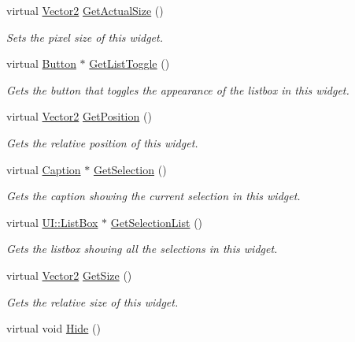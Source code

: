 \begin{DoxyCompactItemize}
virtual \hyperlink{classphys_1_1Vector2}{Vector2} \hyperlink{classphys_1_1UI_1_1DropDownList_afa9ccaef200f9ee8f22be5f32ba1f0a3}{GetActualSize} ()
\begin{DoxyCompactList}\small\item\em Sets the pixel size of this widget. \item\end{DoxyCompactList}\item 
virtual \hyperlink{classphys_1_1UI_1_1Button}{Button} $\ast$ \hyperlink{classphys_1_1UI_1_1DropDownList_abfbbeee72ba061a226f64c2ca93a36a9}{GetListToggle} ()
\begin{DoxyCompactList}\small\item\em Gets the button that toggles the appearance of the listbox in this widget. \item\end{DoxyCompactList}\item 
virtual \hyperlink{classphys_1_1Vector2}{Vector2} \hyperlink{classphys_1_1UI_1_1DropDownList_a179dbf5e16fa6dd10ec8a72ae4349d3c}{GetPosition} ()
\begin{DoxyCompactList}\small\item\em Gets the relative position of this widget. \item\end{DoxyCompactList}\item 
virtual \hyperlink{classphys_1_1UI_1_1Caption}{Caption} $\ast$ \hyperlink{classphys_1_1UI_1_1DropDownList_a78b41941db0b3d8196249ab31d2b174a}{GetSelection} ()
\begin{DoxyCompactList}\small\item\em Gets the caption showing the current selection in this widget. \item\end{DoxyCompactList}\item 
virtual \hyperlink{classphys_1_1UI_1_1ListBox}{UI::ListBox} $\ast$ \hyperlink{classphys_1_1UI_1_1DropDownList_a3b89efdefadc83e7257d34954c0816a6}{GetSelectionList} ()
\begin{DoxyCompactList}\small\item\em Gets the listbox showing all the selections in this widget. \item\end{DoxyCompactList}\item 
virtual \hyperlink{classphys_1_1Vector2}{Vector2} \hyperlink{classphys_1_1UI_1_1DropDownList_ae47b0e9786a39a79fb613c2d1b1fcd38}{GetSize} ()
\begin{DoxyCompactList}\small\item\em Gets the relative size of this widget. \item\end{DoxyCompactList}\item 
\hypertarget{classphys_1_1UI_1_1DropDownList_a919966f2143ad3fd967b6e17092891b3}{
virtual void \hyperlink{classphys_1_1UI_1_1DropDownList_a919966f2143ad3fd967b6e17092891b3}{Hide} ()}
\label{classphys_1_1UI_1_1DropDownList_a919966f2143ad3fd967b6e17092891b3}


\end{DoxyCompactItemize}
